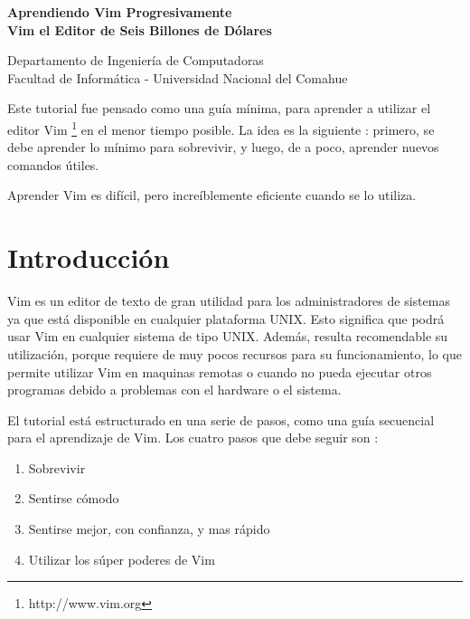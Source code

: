 \documentclass[12pt]{article}
\def\maketitle{

 \makeatletter
 {\color{bl} \centering \huge \sc \textbf{
 Aprendiendo Vim Progresivamente \\ 
\large \vspace*{-8pt} \color{black} Vim el Editor de Seis Billones de Dólares
 \vspace*{8pt} }\par}
 \makeatother


 \makeatletter
 {\centering \small 
 	Departamento de Ingeniería de Computadoras \\
 	Facultad de Informática - Universidad Nacional del Comahue \\
 	\vspace{20pt} }
 \makeatother

}
\begin{document}
\thispagestyle{empty}
\maketitle
\setlength{\parindent}{0pt}


Este tutorial fue pensado como una guía mínima, para aprender a utilizar el editor Vim 
\footnote{http://www.vim.org}
en el menor tiempo posible. La idea es la siguiente : primero, se debe aprender lo mínimo para sobrevivir,
y luego, de a poco, aprender nuevos comandos útiles.

Aprender Vim es difícil, pero increíblemente eficiente cuando se lo utiliza.

\section{Introducción}

Vim es un editor de texto de gran utilidad para los administradores de sistemas ya
que está disponible en cualquier plataforma UNIX. Esto significa
que podrá usar Vim en cualquier sistema de tipo UNIX. Además,
resulta recomendable su utilización, porque requiere de muy pocos
recursos para su funcionamiento, lo que permite utilizar Vim
en maquinas remotas o cuando no pueda ejecutar otros programas
debido a problemas con el hardware o el sistema.


El tutorial está estructurado en una serie de pasos, como una guía
secuencial para el aprendizaje de Vim. Los cuatro pasos que debe seguir son :

\begin{enumerate}
	\item Sobrevivir
	\item Sentirse cómodo
	\item Sentirse mejor, con confianza, y mas rápido
	\item Utilizar los súper poderes de Vim
\end{enumerate}
\end{document}
